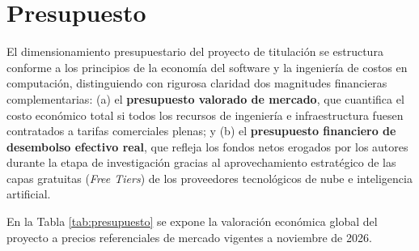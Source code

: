 \section{Presupuesto}

El dimensionamiento presupuestario del proyecto de titulación se estructura conforme a los principios de la economía del software y la ingeniería de costos en computación, distinguiendo con rigurosa claridad dos magnitudes financieras complementarias: (a) el \textbf{presupuesto valorado de mercado}, que cuantifica el costo económico total si todos los recursos de ingeniería e infraestructura fuesen contratados a tarifas comerciales plenas; y (b) el \textbf{presupuesto financiero de desembolso efectivo real}, que refleja los fondos netos erogados por los autores durante la etapa de investigación gracias al aprovechamiento estratégico de las capas gratuitas (\textit{Free Tiers}) de los proveedores tecnológicos de nube e inteligencia artificial.

En la Tabla \ref{tab:presupuesto} se expone la valoración económica global del proyecto a precios referenciales de mercado vigentes a noviembre de 2026.

